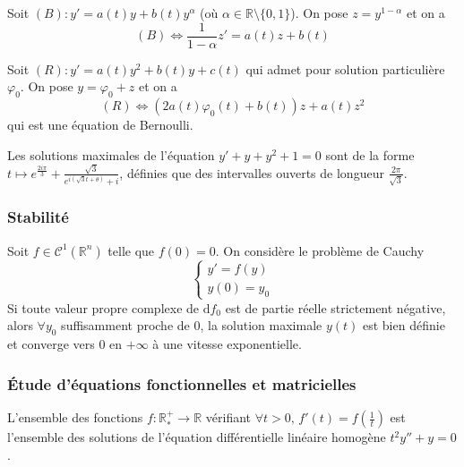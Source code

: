 
  \begin{application}
    Soit $(B) : y' = a(t) y + b(t) y^\alpha$ (où $\alpha \in \mathbb{R} \setminus \{0,1\}$). On pose $z=y^{1-\alpha}$ et on a
    \[ (B) \iff \frac{1}{1-\alpha} z' = a(t)z + b(t) \]
  \end{application}

  \begin{corollary}
    Soit $(R) : y' = a(t) y^2 + b(t) y + c(t)$ qui admet pour solution particulière $\varphi_0$. On pose $y = \varphi_0 + z$ et on a
    \[ (R) \iff (2a(t) \varphi_0(t) + b(t))z + a(t)z^2 \]
    qui est une équation de Bernoulli.
  \end{corollary}

  \begin{example}
    Les solutions maximales de l'équation $y' + y + y^2 + 1 = 0$ sont de la forme $t \mapsto e^{\frac{2i\pi}{3}} + \frac{\sqrt{3}}{e^{i (\sqrt{3}t+\theta)} + i}$, définies que des intervalles ouverts de longueur $\frac{2 \pi}{\sqrt{3}}$.
  \end{example}

  \subsubsection{Stabilité}


  \begin{application}
    Soit $f \in \mathcal{C}^1(\mathbb{R}^n)$ telle que $f(0) = 0$. On considère le problème de Cauchy
    \[ \begin{cases} y'=f(y) \\ y(0) = y_0 \end{cases} \]
    Si toute valeur propre complexe de $\mathrm{d}f_0$ est de partie réelle strictement négative, alors $\forall y_0$ suffisamment proche de $0$, la solution maximale $y(t)$ est bien définie et converge vers $0$ en $+ \infty$ à une vitesse exponentielle.
  \end{application}

  \subsubsection{Étude d'équations fonctionnelles et matricielles}


  \begin{application}
    L'ensemble des fonctions $f : \mathbb{R}^+_* \rightarrow \mathbb{R}$ vérifiant $\forall t > 0, \, f'(t) = f \left( \frac{1}{t} \right)$ est l'ensemble des solutions de l'équation différentielle linéaire homogène $t^2 y'' + y = 0$.
  \end{application}

